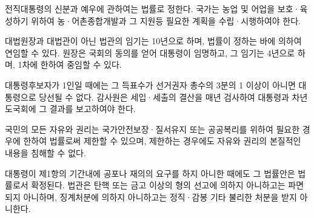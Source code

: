 

전직대통령의 신분과 예우에 관하여는 법률로 정한다. 국가는 농업 및 어업을 보호·육성하기 위하여 농·어촌종합개발과 그 지원등 필요한 계획을 수립·시행하여야 한다.

대법원장과 대법관이 아닌 법관의 임기는 10년으로 하며, 법률이 정하는 바에 의하여 연임할 수 있다. 원장은 국회의 동의를 얻어 대통령이 임명하고, 그 임기는 4년으로 하며, 1차에 한하여 중임할 수 있다.

대통령후보자가 1인일 때에는 그 득표수가 선거권자 총수의 3분의 1 이상이 아니면 대통령으로 당선될 수 없다. 감사원은 세입·세출의 결산을 매년 검사하여 대통령과 차년도국회에 그 결과를 보고하여야 한다.

국민의 모든 자유와 권리는 국가안전보장·질서유지 또는 공공복리를 위하여 필요한 경우에 한하여 법률로써 제한할 수 있으며, 제한하는 경우에도 자유와 권리의 본질적인 내용을 침해할 수 없다.

대통령이 제1항의 기간내에 공포나 재의의 요구를 하지 아니한 때에도 그 법률안은 법률로서 확정된다. 법관은 탄핵 또는 금고 이상의 형의 선고에 의하지 아니하고는 파면되지 아니하며, 징계처분에 의하지 아니하고는 정직·감봉 기타 불리한 처분을 받지 아니한다.